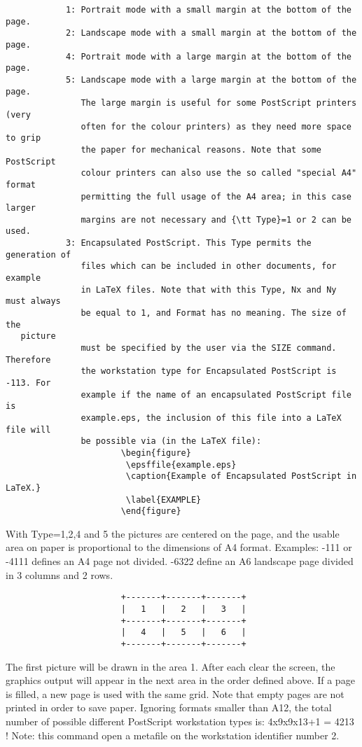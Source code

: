 \begin{verbatim}
            1: Portrait mode with a small margin at the bottom of the page.
            2: Landscape mode with a small margin at the bottom of the page.
            4: Portrait mode with a large margin at the bottom of the page.
            5: Landscape mode with a large margin at the bottom of the page.
               The large margin is useful for some PostScript printers (very
               often for the colour printers) as they need more space to grip
               the paper for mechanical reasons. Note that some PostScript
               colour printers can also use the so called "special A4" format
               permitting the full usage of the A4 area; in this case larger
               margins are not necessary and {\tt Type}=1 or 2 can be used.
            3: Encapsulated PostScript. This Type permits the generation of
               files which can be included in other documents, for example
               in LaTeX files. Note that with this Type, Nx and Ny must always
               be equal to 1, and Format has no meaning. The size of the 
   picture
               must be specified by the user via the SIZE command. Therefore
               the workstation type for Encapsulated PostScript is -113. For
               example if the name of an encapsulated PostScript file is
               example.eps, the inclusion of this file into a LaTeX file will
               be possible via (in the LaTeX file):
                       \begin{figure}
                        \epsffile{example.eps}
                        \caption{Example of Encapsulated PostScript in LaTeX.}
                        \label{EXAMPLE}
                       \end{figure}
\end{verbatim}
   \par
With Type=1,2,4 and 5 the pictures are centered on the page, and the usable 
   area on paper is proportional to the dimensions of A4 format.  Examples:  
   -111 or -4111 defines an A4 page not divided.  -6322 define an A6 landscape 
   page divided in 3 columns and 2 rows.  
\begin{verbatim}
                       +-------+-------+-------+
                       |   1   |   2   |   3   |
                       +-------+-------+-------+
                       |   4   |   5   |   6   |
                       +-------+-------+-------+
\end{verbatim}
   \par
The first picture  will be drawn  in the area 1. After each clear the 
   screen, the graphics output will appear in the next area in the order 
   defined above.  If a page is filled, a new page is used with the same grid. 
   Note that empty pages are not printed in order to save paper.  Ignoring 
   formats smaller than A12, the total number of possible different PostScript 
   workstation types is: 4x9x9x13+1 = 4213 ! Note: this command open a 
   metafile on the workstation identifier number 2.  

